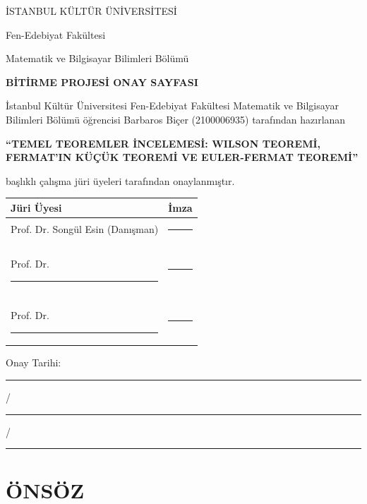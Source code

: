 \documentclass[a4paper,12pt]{article}
\begin{document}
{\scshape\LARGE İSTANBUL KÜLTÜR ÜNİVERSİTESİ \par}
{\large Fen-Edebiyat Fakültesi \par}
{\normalsize Matematik ve Bilgisayar Bilimleri Bölümü \par}
\vspace{1.5cm}

{\large\bfseries BİTİRME PROJESİ ONAY SAYFASI \par}
\vspace{1cm}

\parbox{0.8\textwidth}{
    \centering\normalsize
    İstanbul Kültür Üniversitesi Fen-Edebiyat Fakültesi Matematik ve Bilgisayar Bilimleri Bölümü öğrencisi Barbaros Biçer (2100006935) tarafından hazırlanan
}

\vspace{0.5cm}
{\normalsize\bfseries ``TEMEL TEOREMLER İNCELEMESİ: WILSON TEOREMİ, FERMAT'IN KÜÇÜK TEOREMİ VE EULER-FERMAT TEOREMİ'' \par}
\vspace{0.5cm}

{\normalsize başlıklı çalışma jüri üyeleri tarafından onaylanmıştır. \par}
\vspace{1.5cm}

\begin{tabular}{p{7cm}p{4cm}}
    \hline
    \textbf{Jüri Üyesi} & \textbf{İmza} \\
    \hline
    Prof. Dr. Songül Esin (Danışman) & \rule{3cm}{0.4pt} \\
    \vspace{0.3cm} & \vspace{0.3cm} \\
    Prof. Dr. \rule{5cm}{0.4pt} & \rule{3cm}{0.4pt} \\
    \vspace{0.3cm} & \vspace{0.3cm} \\
    Prof. Dr. \rule{5cm}{0.4pt} & \rule{3cm}{0.4pt} \\
    \hline
\end{tabular}
\vspace{1.5cm}

{\normalsize Onay Tarihi: \rule{2.5cm}{0.4pt} / \rule{2cm}{0.4pt} / \rule{2cm}{0.4pt} \par}

\clearpage
\section*{ÖNSÖZ}
\end{document}
